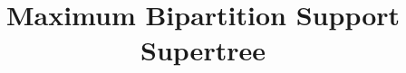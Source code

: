 \documentclass{bmcart}
\theoremstyle{mystyle}
\theoremstyle{proofstyle}
\begin{document}
\setlength{\abovedisplayskip}{6pt}
\setlength{\belowdisplayskip}{6pt}
\setlength{\abovedisplayshortskip}{3pt}
\setlength{\belowdisplayshortskip}{3pt}

\begin{frontmatter}

\begin{fmbox}


\title{Maximum Bipartition Support Supertree}


\author[
   addressref={UIUC},                   %
   email={yuxilin51@gmail.com}   %
]{ }
\author[
   addressref={UIUC},
   email={thienle2@illinois.edu}
]{ }

\author[
   addressref={UIUC},
   email={sac@illinois.edu}
]{ }

\author[
   addressref={UIUC},
   email={emolloy2@illinois.edu}
]{ }

\author[
   addressref={UIUC},
   email={warnow@illinois.edu}
]{ }



\end{fmbox}
\end{frontmatter}
\end{document}
